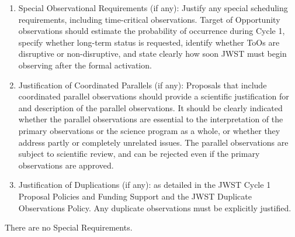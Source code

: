 \documentclass[12pt]{article}
\begin{document}
\begin{enumerate}
\item Special Observational Requirements (if any): Justify any special scheduling requirements, including time-critical observations. Target of Opportunity observations should estimate the probability of occurrence during Cycle 1, specify whether long-term status is requested, identify whether ToOs are disruptive or non-disruptive, and state clearly how soon JWST must begin observing after the formal activation. 
\item Justification of Coordinated Parallels (if any): Proposals that include coordinated parallel observations should provide a scientific justification for and description of the parallel observations. It should be clearly indicated whether the parallel observations are essential to the interpretation of the primary observations or the science program as a whole, or whether they address partly or completely unrelated issues. The parallel observations are subject to scientific review, and can be rejected even if the primary observations are approved. 
\item Justification of Duplications (if any): as detailed in the JWST Cycle 1 Proposal Policies and Funding Support and the JWST Duplicate Observations Policy. Any duplicate observations must be explicitly justified.
\end{enumerate}



  

%
%
\specialreq             %

There are no Special Requirements. 



%
%
\coordinatedobs %
\end{document}

